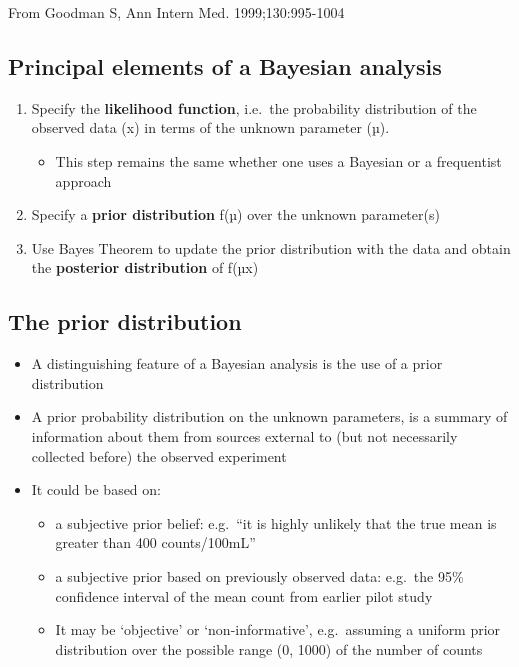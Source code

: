 \documentclass[
]{book}
\providecommand{\tightlist}{%
  \setlength{\itemsep}{0pt}\setlength{\parskip}{0pt}}
\begin{document}
From Goodman S, Ann Intern Med. 1999;130:995-1004

\hypertarget{principal-elements-of-a-bayesian-analysis}{%
\subsection{Principal elements of a Bayesian analysis}\label{principal-elements-of-a-bayesian-analysis}}

\begin{enumerate}
\def\labelenumi{\arabic{enumi}.}
\tightlist
\item
  Specify the \textbf{likelihood function}, i.e.~the probability distribution of the observed data (x) in terms of the unknown parameter (µ).

  \begin{itemize}
  \tightlist
  \item
    This step remains the same whether one uses a Bayesian or a frequentist approach
  \end{itemize}
\item
  Specify a \textbf{prior distribution} f(µ) over the unknown parameter(s)
\item
  Use Bayes Theorem to update the prior distribution with the data and obtain the \textbf{posterior distribution} of f(µ\textbar x)
\end{enumerate}

\hypertarget{the-prior-distribution}{%
\subsection{The prior distribution}\label{the-prior-distribution}}

\begin{itemize}
\tightlist
\item
  A distinguishing feature of a Bayesian analysis is the use of a prior distribution
\item
  A prior probability distribution on the unknown parameters, is a summary of information about them from sources external to (but not necessarily collected before) the observed experiment
\item
  It could be based on:

  \begin{itemize}
  \tightlist
  \item
    a subjective prior belief: e.g.~``it is highly unlikely that the true mean is greater than 400 counts/100mL''
  \item
    a subjective prior based on previously observed data: e.g.~the 95\% confidence interval of the mean count from earlier pilot study
  \item
    It may be `objective' or `non-informative', e.g.~assuming a uniform prior distribution over the possible range (0, 1000) of the number of counts
  \end{itemize}
\end{itemize}
\end{document}

